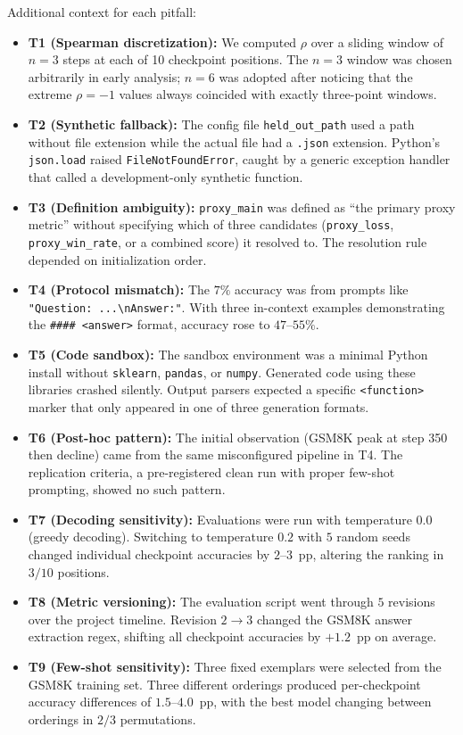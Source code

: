 \documentclass[pdflatex,sn-mathphys-ay,iicol]{sn-jnl}
\theoremstyle{thmstylethree}
\begin{document}
\begin{table}[t]
\begin{table}[t]
Additional context for each pitfall:
\begin{itemize}
    \item \textbf{T1 (Spearman discretization):} We computed $\rho$ over a sliding window of $n=3$ steps at each of 10 checkpoint positions. The $n=3$ window was chosen arbitrarily in early analysis; $n=6$ was adopted after noticing that the extreme $\rho=-1$ values always coincided with exactly three-point windows.
    \item \textbf{T2 (Synthetic fallback):} The config file \texttt{held\_out\_path} used a path without file extension while the actual file had a \texttt{.json} extension. Python's \texttt{json.load} raised \texttt{FileNotFoundError}, caught by a generic exception handler that called a development-only synthetic function.
    \item \textbf{T3 (Definition ambiguity):} \texttt{proxy\_main} was defined as ``the primary proxy metric'' without specifying which of three candidates (\texttt{proxy\_loss}, \texttt{proxy\_win\_rate}, or a combined score) it resolved to. The resolution rule depended on initialization order.
    \item \textbf{T4 (Protocol mismatch):} The $7\%$ accuracy was from prompts like \texttt{"Question: ...\textbackslash nAnswer:"}. With three in-context examples demonstrating the \texttt{\#\#\#\# <answer>} format, accuracy rose to $47$--$55\%$.
    \item \textbf{T5 (Code sandbox):} The sandbox environment was a minimal Python install without \texttt{sklearn}, \texttt{pandas}, or \texttt{numpy}. Generated code using these libraries crashed silently. Output parsers expected a specific \texttt{<function>} marker that only appeared in one of three generation formats.
    \item \textbf{T6 (Post-hoc pattern):} The initial observation (GSM8K peak at step 350 then decline) came from the same misconfigured pipeline in T4. The replication criteria, a pre-registered clean run with proper few-shot prompting, showed no such pattern.
    \item \textbf{T7 (Decoding sensitivity):} Evaluations were run with temperature $0.0$ (greedy decoding). Switching to temperature $0.2$ with $5$ random seeds changed individual checkpoint accuracies by $2$--$3$~pp, altering the ranking in $3/10$ positions.
    \item \textbf{T8 (Metric versioning):} The evaluation script went through $5$ revisions over the project timeline. Revision $2\to3$ changed the GSM8K answer extraction regex, shifting all checkpoint accuracies by $+1.2$~pp on average.
    \item \textbf{T9 (Few-shot sensitivity):} Three fixed exemplars were selected from the GSM8K training set. Three different orderings produced per-checkpoint accuracy differences of $1.5$--$4.0$~pp, with the best model changing between orderings in $2/3$ permutations.
\end{itemize}


\end{table}
\end{table}
\end{document}
